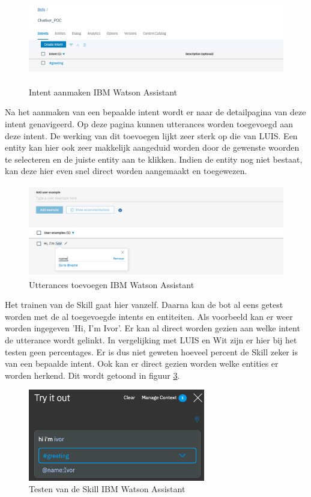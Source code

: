 \begin{figure}[h!]
	\centering
	\includegraphics[height=4cm]{img/ibm_intents.png}
	\caption{Intent aanmaken IBM Watson Assistant}
	\label{fig:intentsIbm}
\end{figure}

Na het aanmaken van een bepaalde intent wordt er naar de detailpagina van deze intent genavigeerd. Op deze pagina kunnen utterances worden toegevoegd aan deze intent. De werking van dit toevoegen lijkt zeer sterk op die van LUIS. Een entity kan hier ook zeer makkelijk aangeduid worden door de gewenste woorden te selecteren en de juiste entity aan te klikken. Indien de entity nog niet bestaat, kan deze hier even snel direct worden aangemaakt en toegewezen.

\begin{figure}[h!]
	\centering
	\includegraphics[height=4cm]{img/imb_utterances.png}
	\caption{Utterances toevoegen IBM Watson Assistant}
	\label{fig:utterancesIbm}
\end{figure}

Het trainen van de Skill gaat hier vanzelf. Daarna kan de bot al eens getest worden met de al toegevoegde intents en entiteiten. Als voorbeeld kan er weer worden ingegeven 'Hi, I'm Ivor'. Er kan al direct worden gezien aan welke intent de utterance wordt gelinkt. In vergelijking met LUIS en Wit zijn er hier bij het testen geen percentages. Er is dus niet geweten hoeveel percent de Skill zeker is van een bepaalde intent. Ook kan er direct gezien worden welke entities er worden herkend. Dit wordt getoond in figuur \ref{fig:tryIbm}.

\begin{figure}[h!]
	\centering
	\includegraphics[height=4cm]{img/ibm_try.png}
	\caption{Testen van de Skill IBM Watson Assistant}
	\label{fig:tryIbm}
\end{figure}

